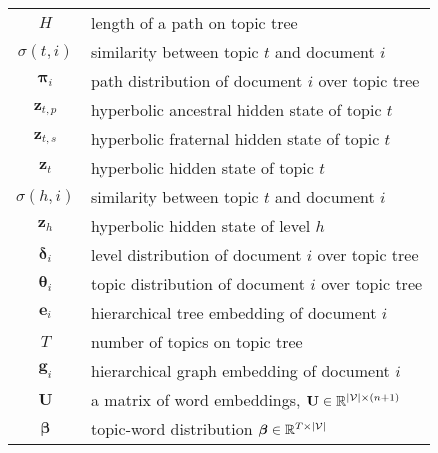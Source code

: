 \begin{table*}[h]
\begin{tabular}{c|l}
			$ H $ & length of a path on topic tree \\
            $ \sigma(t,i) $ & similarity between topic $ t $ and document $ i $ \\
            $ \bm{\pi}_i $ & path distribution of document $ i $ over topic tree \\
            $ \textbf{z}_{t,p} $ & hyperbolic ancestral hidden state of topic $ t $ \\
            $ \textbf{z}_{t,s} $ & hyperbolic fraternal hidden state of topic $ t $ \\
			$ \textbf{z}_t $ & hyperbolic hidden state of topic $ t $ \\
            $ \sigma(h,i) $ & similarity between topic $ t $ and document $ i $ \\
            $ \textbf{z}_h $ & hyperbolic hidden state of level $ h $ \\
			$ \bm{\delta}_i $ & level distribution of document $ i $ over topic tree \\
            $ \bm{\theta}_i $ & topic distribution of document $ i $ over topic tree \\
            $ \textbf{e}_i $ & hierarchical tree embedding of document $ i $ \\
            $ T $ & number of topics on topic tree \\
            $ \textbf{g}_i $ & hierarchical graph embedding of document $ i $ \\
			$ \textbf{U} $ & a matrix of word embeddings, $ \textbf{U}\in\Bbb R^{|\mathcal{V}|\times(n+1)} $ \\
			$ \bm{\beta} $ & topic-word distribution $ \bm{\beta}\in\Bbb R^{T\times |\mathcal{V}|} $ \\
			\bottomrule
		\end{tabular}
	\label{table:notations}
\end{table*}